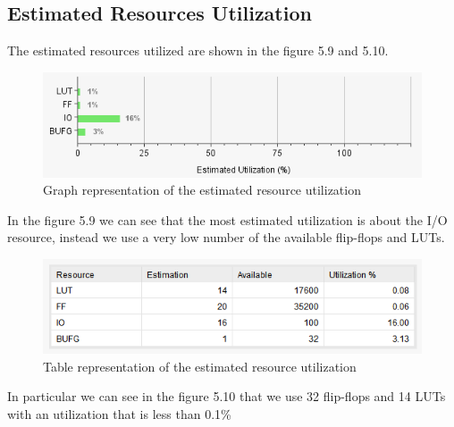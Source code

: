 \documentclass[a4paper]{report}
\begin{document}

\subsection{Estimated Resources Utilization}
The estimated resources utilized are shown in the figure 5.9 and 5.10.

\begin{figure}[htpb]
	\centering
	\includegraphics[scale=0.9]{img/vivado/estimated_utilization1.png}
	\caption{Graph representation of the estimated resource utilization}
\end{figure}


\noindent In the figure 5.9 we can see that the most estimated utilization is about the I/O resource, instead we use a very low number of the available flip-flops and LUTs.

\begin{figure}[htpb]
	\centering
	\includegraphics[scale=0.9]{img/vivado/estimated_utilization2.png}
	\caption{Table representation of the estimated resource utilization}
\end{figure}


\noindent In particular we can see in the figure 5.10 that we use 32 flip-flops and 14 LUTs with an utilization that is less than 0.1\%
\end{document}
